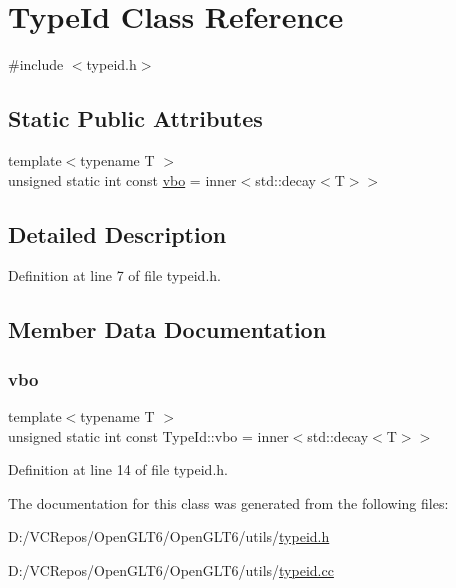 \hypertarget{class_type_id}{}\section{Type\+Id Class Reference}
\label{class_type_id}


{\ttfamily \#include $<$typeid.\+h$>$}

\subsection*{Static Public Attributes}
\begin{DoxyCompactItemize}
\item 
{\footnotesize template$<$typename T $>$ }\\unsigned static int const \mbox{\hyperlink{class_type_id_abf385f40cbb873ea099a0a9f9c4339d5}{vbo}} = inner$<$std\+::decay$<$T$>$$>$
\end{DoxyCompactItemize}


\subsection{Detailed Description}


Definition at line 7 of file typeid.\+h.



\subsection{Member Data Documentation}
\mbox{\label{class_type_id_abf385f40cbb873ea099a0a9f9c4339d5}} 
\subsubsection{\texorpdfstring{vbo}{vbo}}
{\footnotesize\ttfamily template$<$typename T $>$ \\
unsigned static int const Type\+Id\+::vbo = inner$<$std\+::decay$<$T$>$$>$\hspace{0.3cm}{\ttfamily [static]}}



Definition at line 14 of file typeid.\+h.



The documentation for this class was generated from the following files\+:\begin{DoxyCompactItemize}
\item 
D\+:/\+V\+C\+Repos/\+Open\+G\+L\+T6/\+Open\+G\+L\+T6/utils/\mbox{\hyperlink{typeid_8h}{typeid.\+h}}\item 
D\+:/\+V\+C\+Repos/\+Open\+G\+L\+T6/\+Open\+G\+L\+T6/utils/\mbox{\hyperlink{typeid_8cc}{typeid.\+cc}}\end{DoxyCompactItemize}
